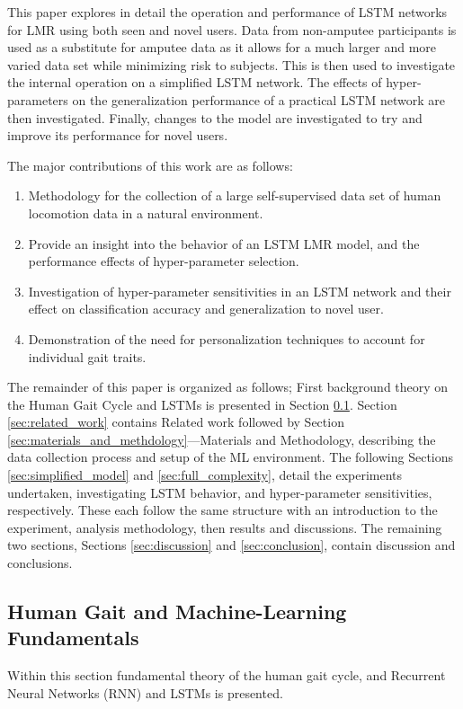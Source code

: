 This paper explores in detail the operation and performance of LSTM networks for LMR using both seen and novel users. Data from non-amputee participants is used as a substitute for amputee data as it allows for a much larger and more varied data set while minimizing risk to subjects. This is then used to investigate the internal operation on a simplified LSTM network. The effects of hyper-parameters on the generalization performance of a practical LSTM network are then investigated. Finally, changes to the model are investigated to try and improve its performance for novel users. 

The major contributions of this work are as follows:
\begin{enumerate}
\item Methodology for the collection of a large self-supervised data set of human locomotion data in a natural environment.
\item Provide an insight into the behavior of an LSTM LMR model, and the performance effects of hyper-parameter selection.
\item Investigation of hyper-parameter sensitivities in an LSTM network and their effect on classification accuracy and generalization to novel user.
\item Demonstration of the need for personalization techniques to account for individual gait traits.
\end{enumerate}

The remainder of this paper is organized as follows; First background theory on the Human Gait Cycle and LSTMs is presented in Section \ref{sec:theory}. Section \ref{sec:related_work} contains Related work followed by Section \ref{sec:materials_and_methdology}---Materials and Methodology, describing the data collection process and setup of the ML environment. The following Sections  \ref{sec:simplified_model} and \ref{sec:full_complexity}, detail the experiments undertaken, investigating LSTM behavior, and hyper-parameter sensitivities, respectively. These each follow the same structure with an introduction to the experiment, analysis methodology, then results and discussions. The remaining two sections, Sections \ref{sec:discussion} and \ref{sec:conclusion}, contain discussion and conclusions.

\subsection{Human Gait and Machine-Learning Fundamentals}
\label{sec:theory}
Within this section fundamental theory of the human gait cycle, and Recurrent Neural Networks (RNN) and LSTMs is presented.

